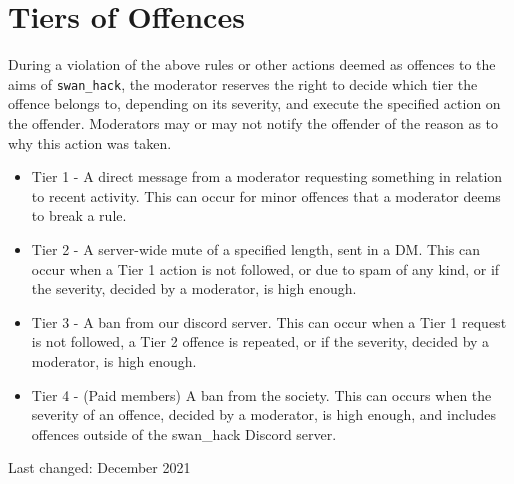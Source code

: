 \documentclass[12pt]{extarticle}
\begin{document}
	\section{Tiers of Offences}
	During a violation of the above rules or other actions deemed as offences to the aims of \texttt{swan\_hack}, the moderator reserves the right to decide which tier the offence belongs to, depending on its severity, and execute the specified action on the offender. Moderators may or may not notify the offender of the reason as to why this action was taken.
    \begin{itemize}
        \item Tier 1 - A direct message from a moderator requesting something in relation to recent activity. This can occur for minor offences that a moderator deems to break a rule. 
	    \item Tier 2 - A server-wide mute of a specified length, sent in a DM. This can occur when a Tier 1 action is not followed, or due to spam of any kind, or if the severity, decided by a moderator, is high enough. 
	    \item Tier 3 - A ban from our discord server. This can occur when a Tier 1 request is not followed, a Tier 2 offence is repeated, or if the severity, decided by a moderator, is high enough. 
	    \item Tier 4 - (Paid members) A ban from the society. This can occurs when the severity of an offence, decided by a moderator, is high enough, and includes offences outside of the swan\_hack Discord server.
	\end{itemize}
	
	\footnotesize Last changed: December 2021 
\end{document}
